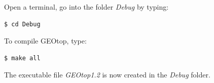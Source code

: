 


%


\noindent Open a terminal, go into the folder \textsl{Debug} by typing:

\footnotesize{
\begin{verbatim}
$ cd Debug
\end{verbatim}
}



\noindent To compile GEOtop, type:

\footnotesize{
\begin{verbatim}
$ make all
\end{verbatim}
}

\noindent The executable file {\it GEOtop1.2} is now created in the {\it Debug} folder.




